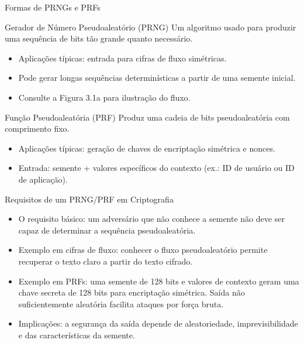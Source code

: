 \begin{frame}{Formas de PRNGs e PRFs}
    \begin{block}{Gerador de Número Pseudoaleatório (PRNG)}
        Um algoritmo usado para produzir uma sequência de bits tão grande quanto necessário.
        \begin{itemize}
            \item Aplicações típicas: entrada para cifras de fluxo simétricas.
            \item Pode gerar longas sequências determinísticas a partir de uma semente inicial.
            \item Consulte a Figura 3.1a para ilustração do fluxo.
        \end{itemize}
    \end{block}

    \begin{block}{Função Pseudoaleatória (PRF)}
        Produz uma cadeia de bits pseudoaleatória com comprimento fixo.
        \begin{itemize}
            \item Aplicações típicas: geração de chaves de encriptação simétrica e nonces.
            \item Entrada: semente + valores específicos do contexto (ex.: ID de usuário ou ID de aplicação).
        \end{itemize}
    \end{block}
\end{frame}

\begin{frame}{Requisitos de um PRNG/PRF em Criptografia}
    \begin{itemize}
        \item O requisito básico: um adversário que não conhece a semente não deve ser capaz de determinar a sequência pseudoaleatória.
        \item Exemplo em cifras de fluxo: conhecer o fluxo pseudoaleatório permite recuperar o texto claro a partir do texto cifrado.
        \item Exemplo em PRFs: uma semente de 128 bits e valores de contexto geram uma chave secreta de 128 bits para encriptação simétrica. Saída não suficientemente aleatória facilita ataques por força bruta.
        \item Implicações: a segurança da saída depende de aleatoriedade, imprevisibilidade e das características da semente.
    \end{itemize}
\end{frame}

